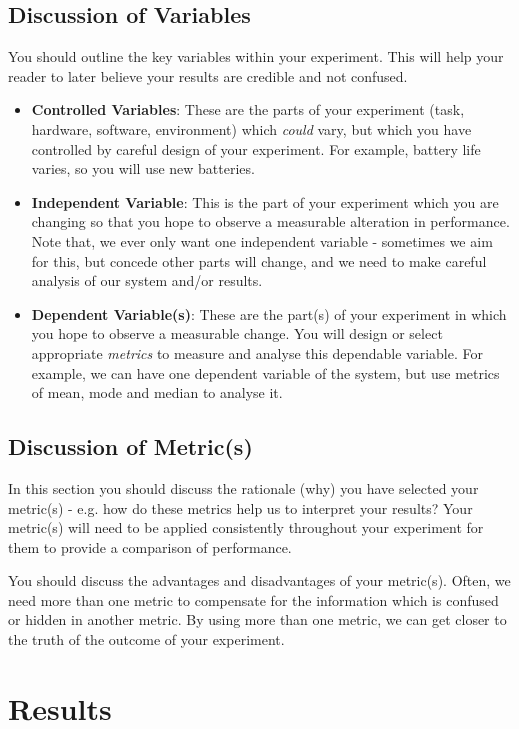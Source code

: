 \documentclass[conference]{IEEEtran}
\begin{document}
\subsection{Discussion of Variables}
You should outline the key variables within your experiment. This will help your reader to later believe your results are credible and not confused.
\begin{itemize}
    \item \textbf{Controlled Variables}: These are the parts of your experiment (task, hardware, software, environment) which \emph{could} vary, but which you have controlled by careful design of your experiment.  For example, battery life varies, so you will use new batteries.
    \item \textbf{Independent Variable}: This is the part of your experiment which you are changing so that you hope to observe a measurable alteration in performance.  Note that, we ever only want one independent variable - sometimes we aim for this, but concede other parts will change, and we need to make careful analysis of our system and/or results.
    \item \textbf{Dependent Variable(s)}: These are the part(s) of your experiment in which you hope to observe a measurable change.  You will design or select appropriate \emph{metrics} to measure and analyse this dependable variable.  For example, we can have one dependent variable of the system, but use metrics of mean, mode and median to analyse it.
\end{itemize}

\subsection{Discussion of Metric(s)}

 In this section you should discuss the rationale (why) you have selected your metric(s) - e.g. how do these metrics help us to interpret your results?  Your metric(s) will need to be applied consistently throughout your experiment for them to provide a comparison of performance.  
 
 You should discuss the advantages and disadvantages of your metric(s).  Often, we need more than one metric to compensate for the information which is confused or hidden in another metric.  By using more than one metric, we can get closer to the truth of the outcome of your experiment.  

\section{Results}
\end{document}

